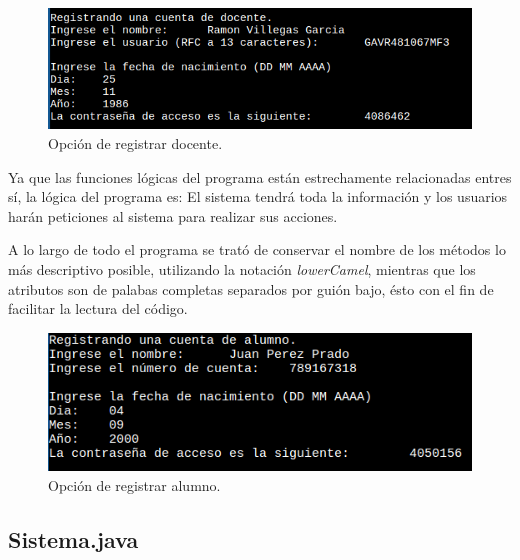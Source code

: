 \documentclass[a4paper,12pt]{article}
\begin{document}
\begin{figure}[ht]
    \centering
    \includegraphics[width=.9\textwidth]{media/registro_docente.png}
    \caption{Opción de registrar docente.}
    \label{fig:regdoc}
\end{figure}

Ya que las funciones lógicas del programa están estrechamente relacionadas entres sí, la lógica del programa es: El sistema tendrá toda la información y los usuarios harán peticiones al sistema para realizar sus acciones.

A lo largo de todo el programa se trató de conservar el nombre de los métodos lo más descriptivo posible, utilizando la notación \textit{lowerCamel}, mientras que los atributos son de palabas completas separados por guión bajo, ésto con el fin de facilitar la lectura del código.

\begin{figure}[ht]
    \centering
    \includegraphics[width=.9\textwidth]{media/registrar_alumno.png}
    \caption{Opción de registrar alumno.}
    \label{fig:regalu}
\end{figure}

\subsection{Sistema.java}
\end{document}
